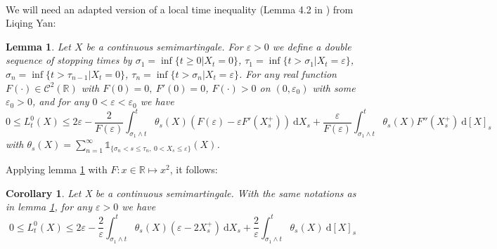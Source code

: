 \documentclass[11pt]{article}
\newtheorem{lem}[theo]{Lemma}
\newtheorem{cor}[theo]{Corollary}
\newcommand{\R}{\mathbb{R}}
\newcommand{\di}{\mathrm{d}}
\begin{document}
        \paragraph{}
        We will need an adapted version of a local time inequality (Lemma 4.2 in \cite{Yan}) from Liqing Yan:        
        \begin{lem}\label{local}
            Let $X$ be a continuous semimartingale. For $\varepsilon>0$ we define a double sequence of stopping times by $\sigma_1 = \inf\{t\geq0 | X_t=0\}$, $\tau_1=\inf\{t>\sigma_1 | X_t=\varepsilon\}$, $\sigma_n = \inf\{t>\tau_{n-1}|X_t=0\}$, $\tau_n=\inf\{t>\sigma_n|X_t=\varepsilon\}$. For any real function $F(\cdot)\in\mathcal{C}^2(\R)$ with $F(0)=0,\ F'(0) = 0$, $F(\cdot) > 0$ on $(0,\varepsilon_0)$ with some $\varepsilon_0 > 0$, and for any $0<\varepsilon<\varepsilon_0$ we have
            \begin{equation*}
                0\leq L^0_t(X) \leq 2\varepsilon - \frac{2}{F(\varepsilon)}\int_{\sigma_1\wedge t}^t \theta_s(X) \left(F\left(\varepsilon\right) - \varepsilon F'\left(X_s^+\right)\right)\ \di X_s
                +\frac{\varepsilon}{F(\varepsilon)}\int_{\sigma_1\wedge t}^t \theta_s(X) F''(X_s^+)\ \di[X]_s
             \end{equation*}
            with $\theta_s(X) = \sum_{n=1}^\infty \mathds{1}_{\{\sigma_n< s\leq \tau_n,\ 0<X_s\leq \varepsilon\}}(X)$.
        \end{lem}        
        Applying lemma \ref{local} with $F:x\in\R \mapsto x^2$, it follows:
        \begin{cor}\label{cor}
            Let X be a continuous semimartingale. With the same notations as in lemma \ref{local}, for any $\varepsilon>0$ we have
            \begin{equation}
                0\leq L^0_t(X) \leq 2\varepsilon - \frac{2}{\varepsilon}\int_{\sigma_1\wedge t}^t \theta_s(X) \left(\varepsilon - 2{X_s^+}\right)\ \di X_s
                +\frac{2}{\varepsilon}\int_{\sigma_1\wedge t}^t \theta_s(X) \ \di[X]_s
            \end{equation}
        \end{cor}
    
\end{document}
